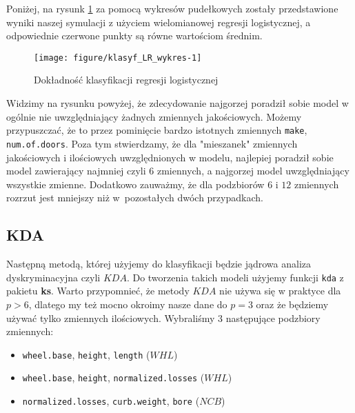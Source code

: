 \documentclass[12pt, a4paper]{article}\usepackage[]{graphicx}\usepackage[]{xcolor}
\makeatletter
\def\maxwidth{ %
  \ifdim\Gin@nat@width>\linewidth
    \linewidth
  \else
    \Gin@nat@width
  \fi
}
\newenvironment{knitrout}{}{} %
\makeatother
\begin{document}
\par
Poniżej, na rysunk \ref{fig:klasyf_LR_wykres} za pomocą wykresów pudełkowych zostały przedstawione wyniki naszej symulacji z użyciem wielomianowej regresji logistycznej, a odpowiednie czerwone punkty są równe wartościom średnim.
\begin{knitrout}
\color{fgcolor}\begin{figure}[H]

{\centering \texttt{[image: figure/klasyf\_LR\_wykres-1]} 

}

\caption[Dokładność klasyfikacji regresji logistycznej]{Dokładność klasyfikacji regresji logistycznej}\label{fig:klasyf_LR_wykres}
\end{figure}

\end{knitrout}
Widzimy na rysunku powyżej, że zdecydowanie najgorzej poradził sobie model w ogólnie nie uwzględniający żadnych zmiennych jakościowych. Możemy przypuszczać, że to przez pominięcie bardzo istotnych zmiennych \texttt{make}, \texttt{num.of.doors}. Poza tym stwierdzamy, że dla "mieszanek" zmiennych jakościowych i ilościowych uwzględnionych w modelu, najlepiej poradził sobie model zawierający najmniej czyli $6$ zmiennych, a najgorzej model uwzględniający wszystkie zmienne. Dodatkowo zauważmy, że dla podzbiorów $6$ i $12$ zmiennych rozrzut jest mniejszy niż w~pozostałych dwóch przypadkach.

\subsection{KDA}

Następną metodą, której użyjemy do klasyfikacji będzie jądrowa analiza dyskryminacyjna czyli $KDA$. Do tworzenia takich modeli użyjemy funkcji \texttt{kda} z pakietu \textbf{ks}. Warto przypomnieć, że metody $KDA$ nie używa się w praktyce dla $p>6$, dlatego my też mocno okroimy nasze dane do $p=3$ oraz że będziemy używać tylko zmiennych ilościowych. Wybraliśmy $3$ następujące podzbiory zmiennych:

\begin{itemize}
\item  \texttt{wheel.base}, \texttt{height}, \texttt{length} ($WHL$)
\item  \texttt{wheel.base}, \texttt{height}, \texttt{normalized.losses} ($WHL$)
\item  \texttt{normalized.losses}, \texttt{curb.weight}, \texttt{bore} ($NCB$)
\end{itemize}
\end{document}
